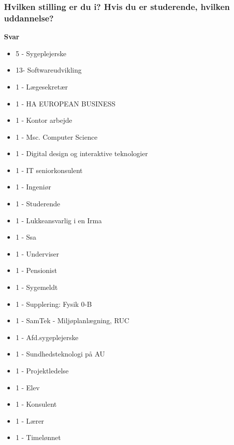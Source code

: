 \subsubsection{Hvilken stilling er du i? Hvis du er studerende, hvilken uddannelse?}
\textbf{Svar}
\begin{itemize}
    \item 5 - Sygeplejerske
    \item 13- Softwareudvikling
    \item 1 - Lægesekretær
    \item 1 - HA EUROPEAN BUSINESS
    \item 1 - Kontor arbejde
    \item 1 - Msc. Computer Science
    \item 1 - Digital design og interaktive teknologier
    \item 1 - IT seniorkonsulent
    \item 1 - Ingeniør
    \item 1 - Studerende
    \item 1 - Lukkeansvarlig i en Irma
    \item 1 - Ssa
    \item 1 - Underviser
    \item 1 - Pensionist
    \item 1 - Sygemeldt
    \item 1 - Supplering: Fysik 0-B
    \item 1 - SamTek - Miljøplanlægning, RUC
    \item 1 - Afd.sygeplejerske
    \item 1 - Sundhedsteknologi på AU
    \item 1 - Projektledelse
    \item 1 - Elev
    \item 1 - Konsulent
    \item 1 - Lærer
    \item 1 - Timelønnet
\end{itemize}

